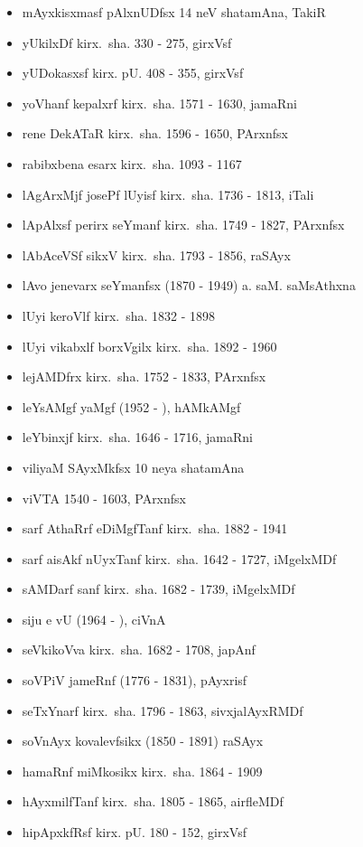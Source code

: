{\begin{itemize}
\item mAyxkisxmasf pAlxnUDfsx {\rm 14} neV shatamAna, TakiR
\item yUkilxDf kirx.~sha. {\rm 330 - 275}, girxVsf
\item yUDokasxsf kirx. pU. {\rm 408 - 355}, girxVsf
\item yoVhanf kepalxrf kirx.~sha. {\rm 1571 - 1630}, jamaRni
\item rene DekATaR kirx.~sha. {\rm 1596 - 1650}, PArxnfsx
\item rabibxbena esarx kirx.~sha. {\rm 1093 - 1167}
\item lAgArxMjf josePf lUyisf kirx.~sha. {\rm 1736 - 1813}, iTali
\item lApAlxsf perirx seYmanf kirx.~sha. {\rm 1749 - 1827}, PArxnfsx
\item lAbAceVSf sikxV kirx.~sha. {\rm 1793 - 1856}, raSAyx
\item lAvo jenevarx seYmanfsx {\rm (1870 - 1949)} a. saM. saMsAthxna
\item lUyi keroVlf kirx.~sha. {\rm 1832 - 1898}
\item lUyi vikabxlf borxVgilx kirx.~sha. {\rm 1892 - 1960}
\item lejAMDfrx kirx.~sha. {\rm 1752 - 1833}, PArxnfsx
\item leYsAMgf yaMgf {\rm (1952 - )}, hAMkAMgf 
\item leYbinxjf kirx.~sha. {\rm 1646 - 1716}, jamaRni
\item viliyaM SAyxMkfsx {\rm 10} neya shatamAna
\item viVTA {\rm 1540 - 1603}, PArxnfsx
\item sarf AthaRrf eDiMgfTanf kirx.~sha. {\rm 1882 - 1941}
\item sarf aisAkf nUyxTanf kirx.~sha. {\rm 1642 - 1727}, iMgelxMDf
\item sAMDarf sanf kirx.~sha. {\rm 1682 - 1739}, iMgelxMDf
\item siju e vU {\rm (1964 - )}, ciVnA
\item seVkikoVva kirx.~sha. {\rm 1682 - 1708}, japAnf
\item soVPiV jameRnf {\rm (1776 - 1831)}, pAyxrisf
\item seTxYnarf kirx.~sha. {\rm 1796 - 1863}, sivxjalAyxRMDf
\item soVnAyx kovalevfsikx {\rm (1850 - 1891)} raSAyx
\item hamaRnf miMkosikx kirx.~sha. {\rm 1864 - 1909}
\item hAyxmilfTanf kirx.~sha. {\rm 1805 - 1865}, airfleMDf
\item hipApxkfRsf kirx. pU. {\rm 180 - 152}, girxVsf

\end{itemize}}
